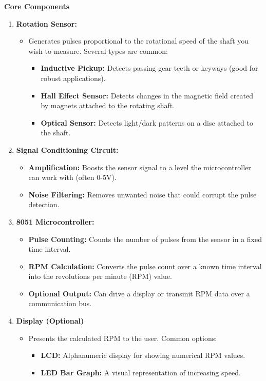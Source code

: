 \documentclass[
]{article}
\begin{document}
\textbf{Core Components}

\begin{enumerate}
\def\labelenumi{\arabic{enumi}.}
\item
  \textbf{Rotation Sensor:}

  \begin{itemize}
  \item
    Generates pulses proportional to the rotational speed of the shaft
    you wish to measure. Several types are common:

    \begin{itemize}
    \item
      \textbf{Inductive Pickup:} Detects passing gear teeth or keyways
      (good for robust applications).
    \item
      \textbf{Hall Effect Sensor:} Detects changes in the magnetic field
      created by magnets attached to the rotating shaft.
    \item
      \textbf{Optical Sensor:} Detects light/dark patterns on a disc
      attached to the shaft.
    \end{itemize}
  \end{itemize}
\item
  \textbf{Signal Conditioning Circuit:}

  \begin{itemize}
  \item
    \textbf{Amplification:} Boosts the sensor signal to a level the
    microcontroller can work with (often 0-5V).
  \item
    \textbf{Noise Filtering:} Removes unwanted noise that could corrupt
    the pulse detection.
  \end{itemize}
\item
  \textbf{8051 Microcontroller:}

  \begin{itemize}
  \item
    \textbf{Pulse Counting:} Counts the number of pulses from the sensor
    in a fixed time interval.
  \item
    \textbf{RPM Calculation:} Converts the pulse count over a known time
    interval into the revolutions per minute (RPM) value.
  \item
    \textbf{Optional Output:} Can drive a display or transmit RPM data
    over a communication bus.
  \end{itemize}
\item
  \textbf{Display (Optional)}

  \begin{itemize}
  \item
    Presents the calculated RPM to the user. Common options:

    \begin{itemize}
    \item
      \textbf{LCD:} Alphanumeric display for showing numerical RPM
      values.
    \item
      \textbf{LED Bar Graph:} A visual representation of increasing
      speed.
    \end{itemize}
  \end{itemize}
\end{enumerate}
\end{document}
